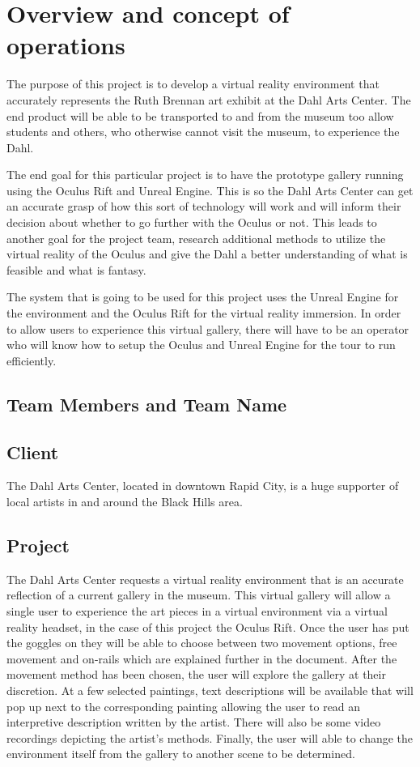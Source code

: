 

\chapter{Overview and concept of operations}

The purpose of this project is to develop a virtual reality environment that accurately represents the Ruth Brennan art exhibit at the Dahl Arts Center.  The end product will be able to be transported to and from the museum too allow students and others, who otherwise cannot visit the museum, to experience the Dahl.

The end goal for this particular project is to have the prototype gallery running using the Oculus Rift and Unreal Engine.  This is so the Dahl Arts Center can get an accurate grasp of how this sort of technology will work and will inform their decision about whether to go further with the Oculus or not.  This leads to another goal for the project team, research additional methods to utilize the virtual reality of the Oculus and give the Dahl a better understanding of what is feasible and what is fantasy.

The system that is going to be used for this project uses the Unreal Engine for the environment and the Oculus Rift for the virtual reality immersion.  In order to allow users to experience this virtual gallery, there will have to be an operator who will know how to setup the Oculus and Unreal Engine for the tour to run efficiently.  

\section{Team Members and Team Name}


\section{Client}
The Dahl Arts Center, located in downtown Rapid City, is a huge supporter of local artists in and around the Black Hills area.

\section{Project}
The Dahl Arts Center requests a virtual reality environment that is an accurate reflection of a current gallery in the museum.  This virtual gallery will allow a single user to experience the art pieces in a virtual environment via a virtual reality headset, in the case of this project the Oculus Rift.  Once the user has put the goggles on they will be able to choose between two movement options, free movement and on-rails which are explained further in the document.  After the movement method has been chosen, the user will explore the gallery at their discretion.  At a few selected paintings, text descriptions will be available that will pop up next to the corresponding painting allowing the user to read an interpretive description written by the artist.  There will also be some video recordings depicting the artist's methods.  Finally, the user will able to change the environment itself from the gallery to another scene to be determined. 

